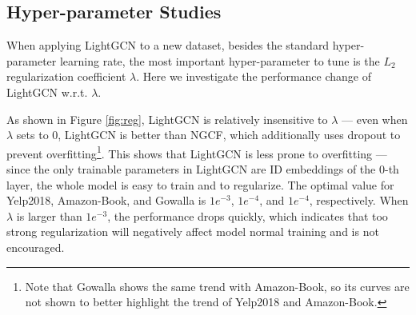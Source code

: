 
\subsection{Hyper-parameter Studies}\label{ss:exp-hyper}
When applying LightGCN to a new dataset, besides the standard hyper-parameter learning rate, the most important hyper-parameter to tune is the $L_2$ regularization coefficient $\lambda$. 
Here we investigate the performance change of LightGCN w.r.t. $\lambda$. 

As shown in Figure \ref{fig:reg},
LightGCN is relatively insensitive to $\lambda$ --- even when $\lambda$ sets to 0, LightGCN is better than NGCF, which additionally uses dropout to prevent overfitting\footnote{Note that Gowalla shows the same trend with Amazon-Book, so its curves are not shown to better highlight the trend of Yelp2018 and Amazon-Book.}. 
This shows that LightGCN is less prone to overfitting --- since the only trainable parameters in LightGCN are ID embeddings of the 0-th layer, the whole model is easy to train and to regularize. The optimal value for Yelp2018, Amazon-Book, and Gowalla is $1e^{-3}$, $1e^{-4}$, and  $1e^{-4}$, respectively. When $\lambda$ is larger than $1e^{-3}$, the performance drops quickly, which indicates that too strong regularization will negatively affect model normal training and is not encouraged. 

